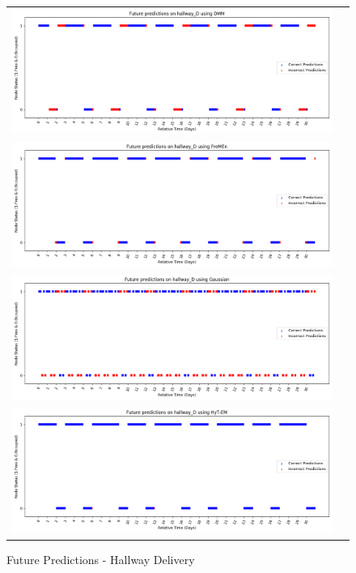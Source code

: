 \begin{figure}[!Hp]
  \begin{tabular}{cc}
    {\includegraphics[width = 6in]{images/results/Future_hallway_D_DMM.png}} \\
    {\includegraphics[width = 6in]{images/results/Future_hallway_D_FreMEn.png}} \\
    {\includegraphics[width = 6in]{images/results/Future_hallway_D_Gaussian.png}} \\
    {\includegraphics[width = 6in]{images/results/Future_hallway_D_HyT-EM.png}} \\
  \end{tabular}
  \caption{Future Predictions - Hallway Delivery}
\end{figure}\\ \\

